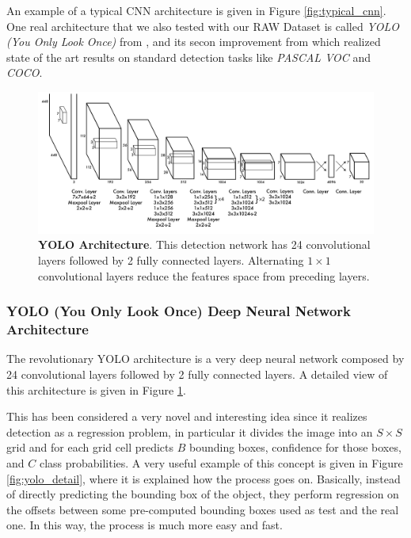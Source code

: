 An example of a typical CNN architecture is given in Figure \ref{fig:typical_cnn}. One real architecture that we also tested with our RAW Dataset is called \emph{YOLO (You Only Look Once)} from \cite{Redmon2016YOLO}, and its secon improvement from \cite{Redmon2017YOLO2} which realized state of the art results on standard detection tasks like \emph{PASCAL VOC} and \emph{COCO}.

\begin{figure}
    \centering
    \includegraphics[width=\textwidth]{figures/1_perception_and_sensing_in_robotics/yolo_architecture}
    \caption{\textbf{YOLO Architecture}. This detection network has 24 convolutional layers followed by 2 fully connected layers. Alternating $1 \times 1$ convolutional layers reduce the features space from preceding layers.} 
    \label{fig:yolo_architecture}
\end{figure}

\subsubsection{YOLO (You Only Look Once) Deep Neural Network Architecture}\label{subsubsec:yolo}
The revolutionary YOLO architecture is a very deep neural network composed by 24 convolutional layers followed by 2 fully connected layers. A detailed view of this architecture is given in Figure \ref{fig:yolo_architecture}.

This has been considered a very novel and interesting idea since it realizes detection as a regression problem, in particular it divides the image into an $S \times S$ grid and for each grid cell predicts $B$ bounding boxes, confidence for those boxes, and $C$ class probabilities. A very useful example of this concept is given in Figure \ref{fig:yolo_detail}, where it is explained how the process goes on. Basically, instead of directly predicting the bounding box of the object, they perform regression on the offsets between some pre-computed bounding boxes used as test and the real one. In this way, the process is much more easy and fast.


